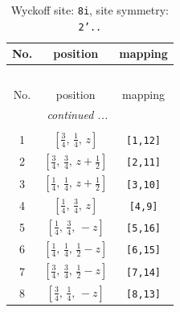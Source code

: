 \documentclass[fleqn,8pt]{jsarticle}
\begin{document}
\begin{longtable}{ccc}
\caption{Wyckoff site: {\tt 8i}, site symmetry: {\tt 2'..}}
 \\
 \hline \hline
No. & position & mapping \\ \hline \endfirsthead

\multicolumn{2}{l}{\tablename\ \thetable{}} \\
 \hline \hline
No. & position & mapping \\ \hline \endhead

 \hline \hline
\multicolumn{2}{r}{\footnotesize\it continued ...} \\ \endfoot

 \hline \hline
\multicolumn{2}{r}{} \\ \endlastfoot

1 & $\left[ \frac{3}{4},\, \frac{1}{4},\, z \right]$ & {\tt [1,12]} \\ \hline
2 & $\left[ \frac{3}{4},\, \frac{3}{4},\, z + \frac{1}{2} \right]$ & {\tt [2,11]} \\ \hline
3 & $\left[ \frac{1}{4},\, \frac{1}{4},\, z + \frac{1}{2} \right]$ & {\tt [3,10]} \\ \hline
4 & $\left[ \frac{1}{4},\, \frac{3}{4},\, z \right]$ & {\tt [4,9]} \\ \hline
5 & $\left[ \frac{1}{4},\, \frac{3}{4},\, - z \right]$ & {\tt [5,16]} \\ \hline
6 & $\left[ \frac{1}{4},\, \frac{1}{4},\, \frac{1}{2} - z \right]$ & {\tt [6,15]} \\ \hline
7 & $\left[ \frac{3}{4},\, \frac{3}{4},\, \frac{1}{2} - z \right]$ & {\tt [7,14]} \\ \hline
8 & $\left[ \frac{3}{4},\, \frac{1}{4},\, - z \right]$ & {\tt [8,13]} \\
\end{longtable}
\renewcommand{\arraystretch}{1.2}
\end{document}
